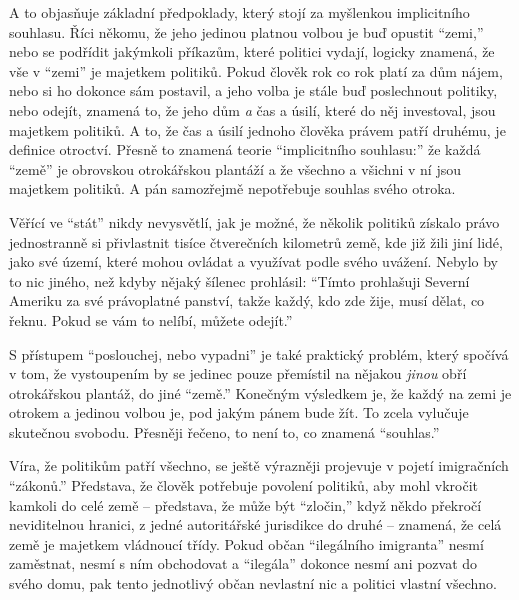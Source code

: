 \documentclass{book}
\begin{document}
A to objasňuje základní předpoklady, který stojí za myšlenkou implicitního souhlasu. Říci někomu, že jeho jedinou platnou volbou je buď opustit \enquote{zemi,} nebo se podřídit jakýmkoli příkazům, které politici vydají, logicky znamená, že vše v \enquote{zemi} je majetkem politiků. Pokud člověk rok co rok platí za dům nájem, nebo si ho dokonce sám postavil, a jeho volba je stále buď poslechnout politiky, nebo odejít, znamená to, že jeho dům \emph{a} čas a úsilí, které do něj investoval, jsou majetkem politiků. A to, že čas a úsilí jednoho člověka právem patří druhému, je definice otroctví. Přesně to znamená teorie \enquote{implicitního souhlasu:} že každá \enquote{země} je obrovskou otrokářskou plantáží a že všechno a všichni v ní jsou majetkem politiků. A pán samozřejmě nepotřebuje souhlas svého otroka.

Věřící ve \enquote{stát} nikdy nevysvětlí, jak je možné, že několik politiků získalo právo jednostranně si přivlastnit tisíce čtverečních kilometrů země, kde již žili jiní lidé, jako své území, které mohou ovládat a využívat podle svého uvážení. Nebylo by to nic jiného, než kdyby nějaký šílenec prohlásil: \enquote{Tímto prohlašuji Severní Ameriku za své právoplatné panství, takže každý, kdo zde žije, musí dělat, co řeknu. Pokud se vám to nelíbí, můžete odejít.}

S přístupem \enquote{poslouchej, nebo vypadni} je také praktický problém, který spočívá v tom, že vystoupením by se jedinec pouze přemístil na nějakou \emph{jinou} obří otrokářskou plantáž, do jiné \enquote{země.} Konečným výsledkem je, že každý na zemi je otrokem a jedinou volbou je, pod jakým pánem bude žít. To zcela vylučuje skutečnou svobodu. Přesněji řečeno, to není to, co znamená \enquote{souhlas.}

Víra, že politikům patří všechno, se ještě výrazněji projevuje v pojetí imigračních \enquote{zákonů.} Představa, že člověk potřebuje povolení politiků, aby mohl vkročit kamkoli do celé země -- představa, že může být \enquote{zločin,} když někdo překročí neviditelnou hranici, z jedné autoritářské jurisdikce do druhé -- znamená, že celá země je majetkem vládnoucí třídy. Pokud občan \enquote{ilegálního imigranta} nesmí zaměstnat, nesmí s ním obchodovat a \enquote{ilegála} dokonce nesmí ani pozvat do svého domu, pak tento jednotlivý občan nevlastní nic a politici vlastní všechno.
\end{document}

